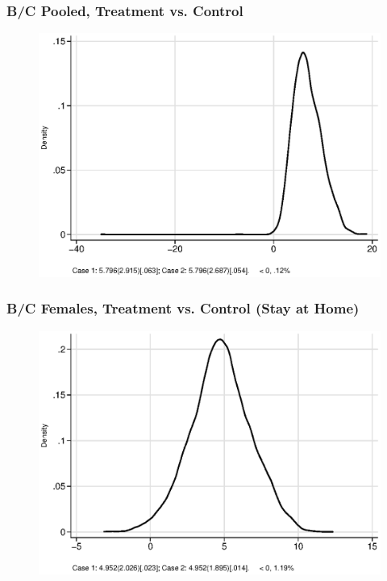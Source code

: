 \documentclass[static]{JJH-Beamer}
\begin{document}
\begin{frame}
\frametitle{B/C Pooled, Treatment vs. Control} 
\begin{figure}
	\includegraphics[width=.8\columnwidth]{output/ratios_2_sexp.eps}
\end{figure}
\end{frame}


\begin{frame}
\frametitle{B/C Females, Treatment vs. Control (Stay at Home)} 
\begin{figure}
	\includegraphics[width=.8\columnwidth]{output/ratios_5_sexf.eps}
\end{figure}
\end{frame}

\end{document}
